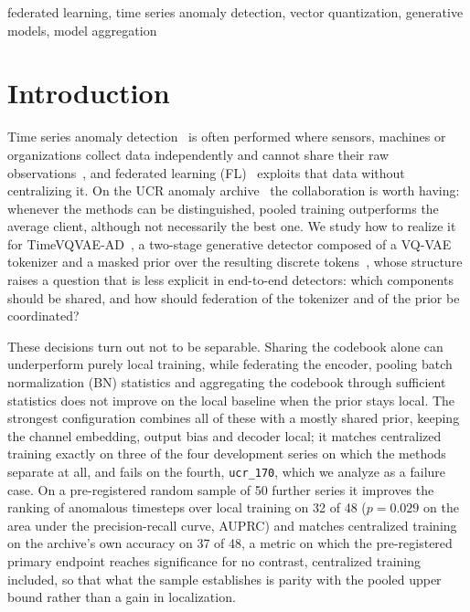 \documentclass[conference]{IEEEtran}
\begin{document}
\begin{IEEEkeywords}
federated learning, time series anomaly detection, vector quantization, generative models,
model aggregation
\end{IEEEkeywords}

\section{Introduction}

Time series anomaly detection~\cite{blazquezgarcia2022review,schmidl2022anomaly} is often performed
where sensors, machines or organizations collect data independently and cannot share their raw
observations~\cite{zhu2022fedexdnn,xu2024pefad}, and federated learning
(FL)~\cite{mcmahan2017federated} exploits that data without centralizing it. On the UCR anomaly
archive~\cite{wu2023ucr} the collaboration is worth having: whenever the methods can be
distinguished, pooled training outperforms the average client, although not necessarily the best
one. We study how to realize it for TimeVQVAE-AD~\cite{lee2024timevqvaead}, a two-stage generative
detector composed of a VQ-VAE~\cite{van2017neural} tokenizer and a masked prior over the resulting
discrete tokens~\cite{lee2023timevqvae}, whose structure raises a question that is less explicit in
end-to-end detectors: which components should be shared, and how should federation of the tokenizer
and of the prior be coordinated?

These decisions turn out not to be separable. Sharing the codebook alone can underperform purely
local training, while federating the encoder, pooling batch normalization (BN) statistics and
aggregating the codebook through sufficient statistics does not improve on the local baseline when
the prior stays local. The strongest configuration combines all of these with a mostly shared prior,
keeping the channel embedding, output bias and decoder local; it matches centralized training
exactly on three of the four development series on which the methods separate at all, and fails on
the fourth, \texttt{ucr\_170}, which we analyze as a failure case. On a pre-registered random sample of
50 further series it improves the ranking of anomalous timesteps over local training on 32 of 48
($p=0.029$ on the area under the precision-recall curve, AUPRC) and matches centralized training
on the archive's own accuracy on 37 of 48,
a metric on which the pre-registered primary endpoint reaches significance for no contrast,
centralized training included, so that what the sample establishes is parity with the pooled upper
bound rather than a gain in localization.
\end{document}
